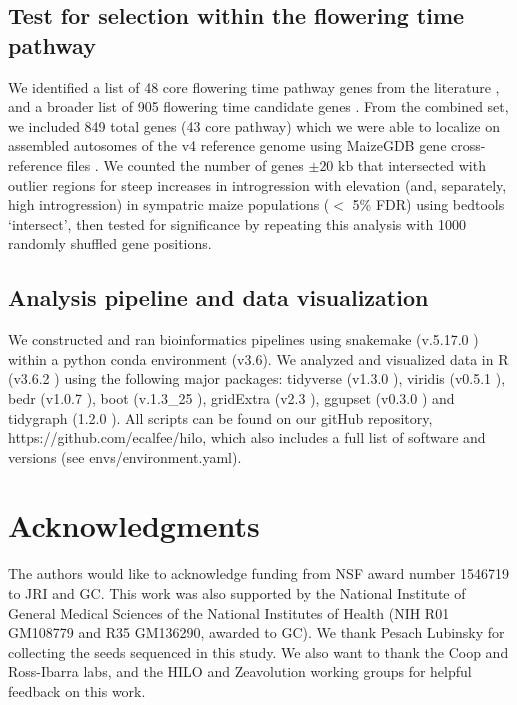 \subsection*{Test for selection within the flowering time pathway}
We identified a list of 48 core flowering time pathway genes from the literature \cite{Dong:2012_flowering}, and a broader list of 905 flowering time candidate genes \cite{Li:2016_flowering, Dong:2012_flowering}. 
From the combined set, we included 849 total genes (43 core pathway) which we were able to localize on assembled autosomes of the v4 reference genome using MaizeGDB gene cross-reference files \cite{Portwood:2019_MaizeGDB}.
We counted the number of genes $\pm 20$ kb that intersected with outlier regions for steep increases in \mexicana introgression with elevation (and, separately, high \mexicana introgression) in sympatric maize populations ($<$ 5\% FDR) using bedtools ‘intersect', then tested for significance by repeating this analysis with 1000 randomly shuffled gene positions.


\subsection*{Analysis pipeline and data visualization}

We constructed and ran bioinformatics pipelines using snakemake (v.5.17.0 \cite{Koester_Rahmann:2012_snakemake}) within a python conda environment (v3.6). 
We analyzed and visualized data in R (v3.6.2 \cite{R_stats}) using the following major packages: tidyverse (v1.3.0 \cite{R_tidyverse}), viridis (v0.5.1 \cite{R_viridis}), bedr (v1.0.7 \cite{R_bedr}), boot (v.1.3\_25 \cite{R_boot, Davison_Hinkley:1997_boot}), gridExtra (v2.3 \cite{R_gridExtra}), ggupset (v0.3.0 \cite{R_ggupset}) and tidygraph (1.2.0 \cite{R_tidygraph}). 
All scripts can be found on our gitHub repository, https://github.com/ecalfee/hilo, which also includes a full list of software and versions (see envs/environment.yaml).


\section*{Acknowledgments}
The authors would like to acknowledge funding from NSF award number 1546719 to JRI and GC. This work was also supported by the National Institute of General Medical Sciences of the National Institutes of Health (NIH R01 GM108779 and R35 GM136290, awarded to GC). We thank Pesach Lubinsky for collecting the seeds sequenced in this study. We also want to thank the Coop and Ross-Ibarra labs, and the HILO and Zeavolution working groups for helpful feedback on this work.


